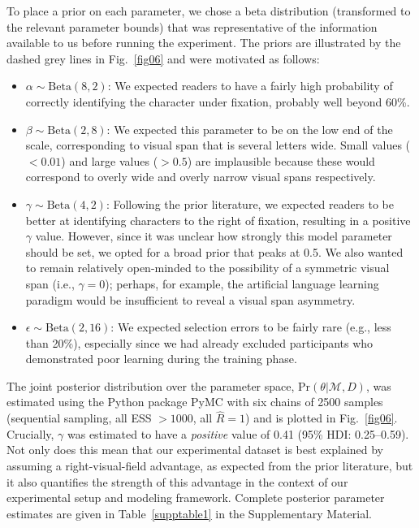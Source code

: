 \documentclass[doc,biblatex,floatsintext]{apa7}
\begin{document}
To place a prior on each parameter, we chose a beta distribution (transformed to the relevant parameter bounds) that was representative of the information available to us before running the experiment. The priors are illustrated by the dashed grey lines in Fig.~\ref{fig06} and were motivated as follows:
\begin{itemize}
    \item $\alpha \sim \mathrm{Beta}(8, 2)$: We expected readers to have a fairly high probability of correctly identifying the character under fixation, probably well beyond 60\%.
    \item $\beta \sim \mathrm{Beta}(2, 8)$: We expected this parameter to be on the low end of the scale, corresponding to visual span that is several letters wide. Small values ($< 0.01$) and large values ($> 0.5$) are implausible because these would correspond to overly wide and overly narrow visual spans respectively.
    \item $\gamma \sim \mathrm{Beta}(4, 2)$: Following the prior literature, we expected readers to be better at identifying characters to the right of fixation, resulting in a positive $\gamma$ value. However, since it was unclear how strongly this model parameter should be set, we opted for a broad prior that peaks at 0.5. We also wanted to remain relatively open-minded to the possibility of a symmetric visual span (i.e., $\gamma = 0$); perhaps, for example, the artificial language learning paradigm would be insufficient to reveal a visual span asymmetry.
    \item $\epsilon \sim \mathrm{Beta}(2, 16)$: We expected selection errors to be fairly rare (e.g., less than 20\%), especially since we had already excluded participants who demonstrated poor learning during the training phase.
\end{itemize}

The joint posterior distribution over the parameter space, $\mathrm{Pr}(\theta|\mathcal{M},D)$, was estimated using the Python package PyMC with six chains of 2500 samples (sequential sampling, all ESS $> 1000$, all $\hat{R}=1$) and is plotted in Fig.~\ref{fig06}. Crucially, $\gamma$ was estimated to have a \textit{positive} value of 0.41 (95\% HDI: 0.25--0.59). Not only does this mean that our experimental dataset is best explained by assuming a right-visual-field advantage, as expected from the prior literature, but it also quantifies the strength of this advantage in the context of our experimental setup and modeling framework. Complete posterior parameter estimates are given in Table~\ref{supptable1} in the Supplementary Material.
\end{document}
